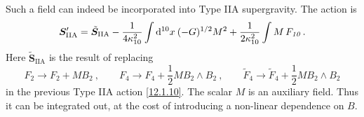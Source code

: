 Such a field can indeed be incorporated into Type IIA supergravity. The action is
\begin{equation}
	\bm{S}_{\text{IIA}}^{\prime}=\tilde{\bm{S}}_{\text{IIA}}-\frac{1}{4\kappa_{10}^{2}}\int\mathrm{d}^{10}x\: (-G)^{1/2}M^{2}+\frac{1}{2\kappa_{10}^{2}}\int M\,F_{\textit{10}}\:. \label{12.1.24}
\end{equation}
Here $\tilde{\bm{S}}_{\text{IIA}}$ is the result of replacing
\begin{equation}
	F_{\textit{2}}\to F_{\textit{2}}+MB_{\textit{2}}\:, \qquad 
	F_{\textit{4}}\to F_{\textit{4}}+\frac{1}{2}MB_{\textit{2}}\wedge B_{\textit{2}}\:,\qquad \tilde{F}_{\textit{4}}\to\tilde{F}_{\textit{4}}+\frac{1}{2}MB_{\textit{2}}\wedge B_\textit{2} \label{12.1.25}
\end{equation}
in the previous Type IIA action \eqref{12.1.10}. The scalar $M$ is an auxiliary field. Thus it can be integrated out, at the cost of introducing a non-linear dependence on $B$.
